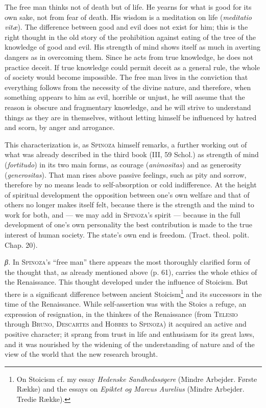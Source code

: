 \documentclass[12pt]{article}
\newcommand{\opage}[1]{\marginnote{\footnotesize\textit{[#1]}}}
\begin{document}
The free man thinks not of death but of life. He yearns for what is good for its own sake, not from
fear of death. His wisdom is a meditation on life (\textit{meditatio vitæ}). The difference between
good and evil does not exist for him; this is the right thought in the old story of the prohibition
against eating of the tree of the knowledge of good and evil. His strength of mind shows itself as
much in averting dangers as in overcoming them. Since he acts from true knowledge, he does not
practice deceit. If true knowledge could permit deceit as a general rule, the whole of society would
become impossible. The free man lives in the conviction \opage{82}that everything follows from the
necessity of the divine nature, and therefore, when something appears to him as evil, horrible or
unjust, he will assume that the reason is obscure and fragmentary knowledge, and he will strive to
understand things as they are in themselves, without letting himself be influenced by hatred and
scorn, by anger and arrogance.

This characterization is, as \textsc{Spinoza} himself remarks, a further working out of what was
already described in the third book (III, 59 Schol.) as strength of mind (\textit{fortitudo}) in its
two main forms, as courage (\textit{animositas}) and as generosity (\textit{generositas}). That man
rises above passive feelings, such as pity and sorrow, therefore by no means leads to
self-absorption or cold indifference. At the height of spiritual development the opposition between
one's own welfare and that of others no longer makes itself felt, because there is the strength and
the mind to work for both, and --- we may add in \textsc{Spinoza}'s spirit --- because in the full
development of one's own personality the best contribution is made to the true interest of human
society. The state's own end is freedom. (Tract. theol. polit. Chap. 20). %

\textit{β.} In \textsc{Spinoza}'s ``free man'' there appears the most thoroughly clarified form of
the thought that, as already mentioned above (p. 61), carries the whole ethics of the Renaissance.
This thought developed under the influence of Stoicism. But there is a significant difference
between ancient Stoicism\footnote{On Stoicism cf. my essay \textit{Hedenske Sandhedssøgere}
(Mindre Arbejder. Første Række) and the essays on \textit{Epiktet og Marcus Aurelius} (Mindre
Arbejder. Tredie Række).} and its successors in the time of the Renaissance. While self-assertion
was with the Stoics a refuge, an expression of resignation, in the thinkers of the Renaissance
(from \textsc{Telesio} through \textsc{Bruno}, \textsc{Descartes} and \textsc{Hobbes} to
\textsc{Spinoza}) it acquired an active and positive character; it sprang from trust in life and
enthusiasm for its great laws, and it was nourished by the widening of the understanding of nature
and of the view of the world that the new research brought.
\end{document}
